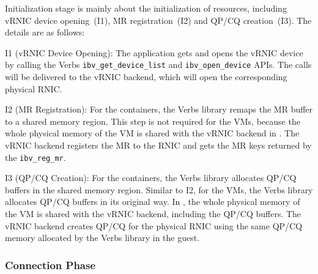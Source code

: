 Initialization stage is mainly about the initialization of resources, including vRNIC device opening~(I1), MR registration~(I2) and QP/CQ creation~(I3). The details are as follows:


I1 (vRNIC Device Opening): The application gets and opens the vRNIC device by calling the Verbs \texttt{ibv\_get\_device\_list} and \texttt{ibv\_open\_device} APIs. The calls will be delivered to the vRNIC backend, which will open the corresponding physical RNIC.


I2 (MR Registration): For the containers, the Verbs library remaps the MR buffer to a shared memory region. This step is not required for the VMs, because the whole physical memory of the VM is shared with the vRNIC backend in \sys. The vRNIC backend registers the MR to the RNIC and gets the MR keys returned by the \texttt{ibv\_reg\_mr}.


I3 (QP/CQ Creation): For the containers, the Verbs library allocates QP/CQ buffers in the shared memory region. Similar to I2, for the VMs, the Verbs library allocates QP/CQ buffers in its original way. In \sys, the whole physical memory of the VM is shared with the vRNIC backend, including the QP/CQ buffers. The vRNIC backend creates QP/CQ for the physical RNIC using the same QP/CQ memory allocated by the Verbs library in the guest.


\subsubsection{\textbf{Connection Phase}}
\
\noindent

